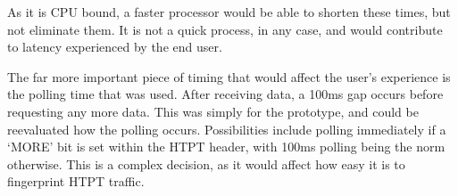 As it is CPU bound, a faster processor would be able to shorten these times, but not eliminate them. It is not a quick process, in any case, and would contribute to latency experienced by the end user. 

The far more important piece of timing that would affect the user's experience is the polling time that was used. After receiving data, a 100ms gap occurs before requesting any more data. This was simply for the prototype, and could be reevaluated how the polling occurs. Possibilities include polling immediately if a `MORE' bit is set within the HTPT header, with 100ms polling being the norm otherwise. This is a complex decision, as it would affect how easy it is to fingerprint HTPT traffic. 



